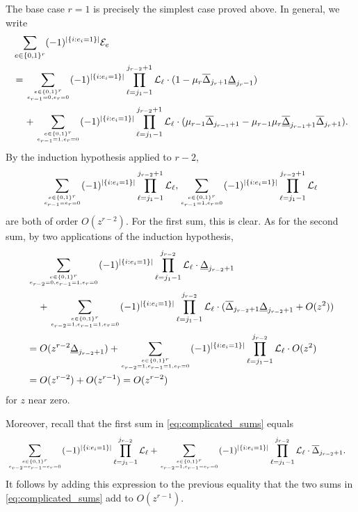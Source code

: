 \documentclass[11pt]{amsart}
\numberwithin{theorem}{section}
\numberwithin{equation}{section}
\theoremstyle{remark}
\theoremstyle{definition}
\begin{document}
The base case $r=1$ is precisely the simplest case proved above.
In general, we write
\begin{align} \label{eq:complicated_sum}
&\sum_{e\in\{0,1\}^r} (-1)^{|\{i:e_i=1\}|} \mathcal E_e \\ \notag
&= \sum_{e\in\{0,1\}^r \atop e_{r-1}=0,e_r=0} (-1)^{|\{i:e_i=1\}|} \prod_{\ell=j_1-1}^{j_{r-2}+1}\mathcal L_\ell \cdot (1-\mu_r\overline{\Delta}_{j_r+1}\underline{\Delta}_{j_r-1}) \\ \notag &\hspace{4mm}+ \sum_{e \in \{0,1\}^r \atop e_{r-1}=1,e_r=0}(-1)^{|\{i:e_i=1\}|} \prod_{\ell=j_1-1}^{j_{r-2}+1}\mathcal L_\ell \cdot(\mu_{r-1}\overline{\Delta}_{j_{r-1}+1} - \mu_{r-1}\mu_r\overline{\underline{\Delta}}_{j_{r-1}+1}\overline{\Delta}_{j_r+1}).
\end{align}
By the induction hypothesis applied to $r-2$,
\begin{equation}\label{eq:complicated_sums}
\sum_{e \in \{0,1\}^r \atop e_{r-1}=e_r=0}(-1)^{|\{i:e_i=1\}|} \prod_{\ell=j_1-1}^{j_{r-2}+1}\mathcal L_\ell, \sum_{e \in \{0,1\}^r \atop e_{r-1}=1, e_r=0}(-1)^{|\{i:e_i=1\}|} \prod_{\ell=j_1-1}^{j_{r-2}+1}\mathcal L_\ell 
\end{equation}
are both of order $O(z^{r-2})$. 
For the first sum, this is clear.
As for the second sum, by two applications of the induction hypothesis,
\begin{align*}
&\sum_{e \in \{0,1\}^r \atop e_{r-2}=0, e_{r-1}=1, e_r=0}(-1)^{|\{i:e_i=1\}|} \prod_{\ell=j_1-1}^{j_{r-2}}\mathcal L_\ell \cdot \underline{\Delta}_{j_{r-2}+1} \\
&\hspace{4mm}+ \sum_{e \in \{0,1\}^r \atop e_{r-2}=1, e_{r-1}=1, e_r=0}(-1)^{|\{i:e_i=1\}|} \prod_{\ell=j_1-1}^{j_{r-2}}\mathcal L_\ell \cdot (\overline\Delta_{j_{r-2}+1}\underline{\Delta}_{j_{r-2}+1}+O(z^2)) \\
&= O(z^{r-2}\underline{\Delta}_{j_{r-2}+1}) + \sum_{e \in \{0,1\}^r \atop e_{r-2}=1, e_{r-1}=1, e_r=0}(-1)^{|\{i:e_i=1\}|} \prod_{\ell=j_1-1}^{j_{r-2}}\mathcal L_\ell \cdot O(z^2) \\
&= O(z^{r-2}) + O(z^{r-1}) = O(z^{r-2})
\end{align*}
for $z$ near zero.

Moreover, recall that the first sum in \eqref{eq:complicated_sums} equals
\begin{align*}
&\sum_{e \in \{0,1\}^r \atop e_{r-2}=e_{r-1}=e_r=0}(-1)^{|\{i:e_i=1\}|} \prod_{\ell=j_1-1}^{j_{r-2}}\mathcal L_\ell + \sum_{e \in \{0,1\}^r \atop e_{r-2}=1, e_{r-1}= e_r=0}(-1)^{|\{i:e_i=1\}|} \prod_{\ell=j_1-1}^{j_{r-2}}\mathcal L_\ell \cdot \overline\Delta_{j_{r-2}+1}.
\end{align*}
It follows by adding this expression to the previous equality that the two sums in \eqref{eq:complicated_sums} add to $O(z^{r-1})$.
\end{document}
